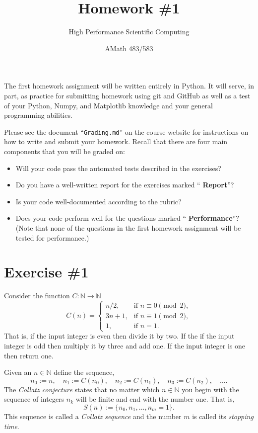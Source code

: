 \documentclass[12pt]{article}
\title{Homework \#1}
\author{High Performance Scientific Computing}
\date{AMath 483/583}
\begin{document}
\maketitle

The first homework assignment will be written entirely in Python. It will serve,
in part, as practice for submitting homework using git and GitHub as well as a
test of your Python, Numpy, and Matplotlib knowledge and your general
programming abilities.

Please see the document ``{\tt Grading.md}'' on the course website for
instructions on how to write and submit your homework. Recall that there are
four main components that you will be graded on:
\begin{itemize}
\item Will your code pass the automated tests described in the exercises?
\item Do you have a well-written report for the exercises marked ``{\bf
    Report}''?
\item Is your code well-documented according to the rubric?
\item Does your code perform well for the questions marked ``{\bf
    Performance}''? (Note that none of the questions in the first homework
  assignment will be tested for performance.)
\end{itemize}



\section*{Exercise \#1}



Consider the function $C : \mathbb{N} \to \mathbb{N}$
\[
  C(n) = 
  \begin{cases}
    n/2,    & \text{if } n \equiv 0 \pmod{2}, \\
    3n + 1, & \text{if } n \equiv 1 \pmod{2}, \\
    1, & \text{if } n = 1.
  \end{cases}
\]
That is, if the input integer is even then divide it by two. If the if the input
integer is odd then multiply it by three and add one. If the input integer is
one then return one.

Given an $n \in \mathbb{N}$ define the sequence,
\[
  n_0 := n, \quad
  n_1 := C(n_0), \quad
  n_2 := C(n_1), \quad
  n_3 := C(n_2), \quad
  \ldots.
\]
The {\it Collatz conjecture} states that no matter which $n \in \mathbb{N}$ you
begin with the sequence of integers $n_k$ will be finite and end with the number
one. That is,
\[
  S(n) := \{n_0, n_1, \ldots, n_m = 1\}.
\]
This sequence is called a {\it Collatz sequence} and the number $m$ is called
its {\it stopping time}.
\end{document}
